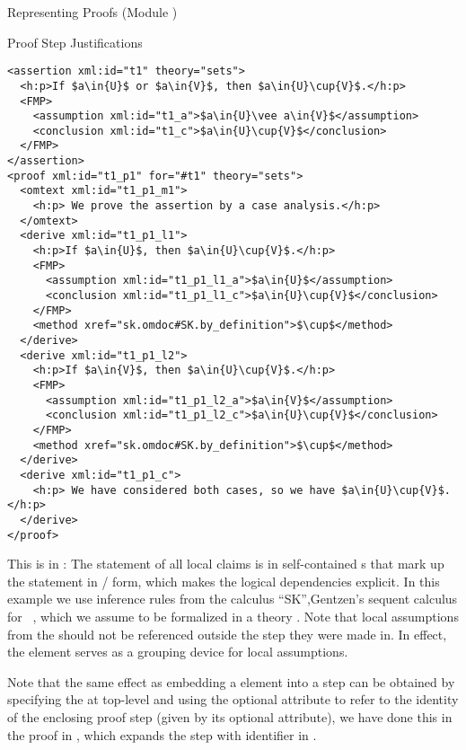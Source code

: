 \begin{omgroup}[id=proofs,short=Representing Proofs]{Representing Proofs (Module {})}
\begin{module}[id=justifications]
\begin{omgroup}[id=proofs.justifications]{Proof Step Justifications}
\begin{lstlisting}[label=lst:expansion,mathescape,
  caption={An \omdoc Representation of a Proof by Cases},
  index={proof,derive,method,assumption,conclusion}]
<assertion xml:id="t1" theory="sets">
  <h:p>If $a\in{U}$ or $a\in{V}$, then $a\in{U}\cup{V}$.</h:p>
  <FMP>
    <assumption xml:id="t1_a">$a\in{U}\vee a\in{V}$</assumption>
    <conclusion xml:id="t1_c">$a\in{U}\cup{V}$</conclusion>
  </FMP>
</assertion>
<proof xml:id="t1_p1" for="#t1" theory="sets">
  <omtext xml:id="t1_p1_m1">
    <h:p> We prove the assertion by a case analysis.</h:p>
  </omtext>
  <derive xml:id="t1_p1_l1">
    <h:p>If $a\in{U}$, then $a\in{U}\cup{V}$.</h:p>
    <FMP>
      <assumption xml:id="t1_p1_l1_a">$a\in{U}$</assumption>
      <conclusion xml:id="t1_p1_l1_c">$a\in{U}\cup{V}$</conclusion>
    </FMP>
    <method xref="sk.omdoc#SK.by_definition">$\cup$</method>
  </derive> 
  <derive xml:id="t1_p1_l2">
    <h:p>If $a\in{V}$, then $a\in{U}\cup{V}$.</h:p>
    <FMP>
      <assumption xml:id="t1_p1_l2_a">$a\in{V}$</assumption>
      <conclusion xml:id="t1_p1_l2_c">$a\in{U}\cup{V}$</conclusion>
    </FMP>
    <method xref="sk.omdoc#SK.by_definition">$\cup$</method>
  </derive> 
  <derive xml:id="t1_p1_c">
    <h:p> We have considered both cases, so we have $a\in{U}\cup{V}$.</h:p>
  </derive> 
</proof>
\end{lstlisting}
This  is in {}: The statement of
all local claims is in self-contained {s} that mark up the statement in
/ form, which makes the logical dependencies
explicit. In this example we use inference rules from the calculus ``SK'',Gentzen's
sequent calculus for {}~\cite{Gentzen:uudlsiii35},
which we assume to be formalized in a theory {}.  Note that local assumptions
from the  should not be referenced outside the  step they
were made in. In effect, the  element serves as a grouping device for
local assumptions.

Note that the same effect as embedding a  element into a
 step can be obtained by specifying the  at top-level
and using the optional  attribute to refer to the identity of the
enclosing proof step (given by its optional 
attribute), we have done this in the proof in {}, which expands the
 step with identifier {} in {}.


\end{omgroup}
\end{module}
\end{omgroup}
